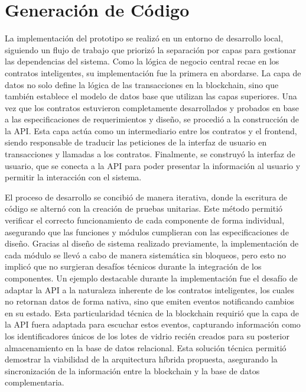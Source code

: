 \section{Generación de Código}
\label{sec:code-generation}

La implementación del prototipo se realizó en un entorno de desarrollo local, siguiendo un flujo de trabajo que priorizó la separación por capas para gestionar las dependencias del sistema. Como la lógica de negocio central recae en los contratos inteligentes, su implementación fue la primera en abordarse. La capa de datos no solo define la lógica de las transacciones en la blockchain, sino que también establece el modelo de datos base que utilizan las capas superiores. Una vez que los contratos estuvieron completamente desarrollados y probados en base a las especificaciones de requerimientos y diseño, se procedió a la construcción de la API. Esta capa actúa como un intermediario entre los contratos y el frontend, siendo responsable de traducir las peticiones de la interfaz de usuario en transacciones y llamadas a los contratos. Finalmente, se construyó la interfaz de usuario, que se conecta a la API para poder presentar la información al usuario y permitir la interacción con el sistema.

El proceso de desarrollo se concibió de manera iterativa, donde la escritura de código se alternó con la creación de pruebas unitarias. Este método permitió verificar el correcto funcionamiento de cada componente de forma individual, asegurando que las funciones y módulos cumplieran con las especificaciones de diseño. Gracias al diseño de sistema realizado previamente, la implementación de cada módulo se llevó a cabo de manera sistemática sin bloqueos, pero esto no implicó que no surgieran desafíos técnicos durante la integración de los componentes. Un ejemplo destacable durante la implementación fue el desafío de adaptar la API a la naturaleza inherente de los contratos inteligentes, los cuales no retornan datos de forma nativa, sino que emiten eventos notificando cambios en su estado. Esta particularidad técnica de la blockchain requirió que la capa de la API fuera adaptada para escuchar estos eventos, capturando información como los identificadores únicos de los lotes de vidrio recién creados para su posterior almacenamiento en la base de datos relacional. Esta solución técnica permitió demostrar la viabilidad de la arquitectura híbrida propuesta, asegurando la sincronización de la información entre la blockchain y la base de datos complementaria.

